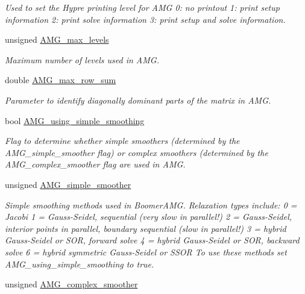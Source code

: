 \begin{DoxyCompactItemize}
\begin{DoxyCompactList}\small\item\em Used to set the Hypre printing level for A\+MG 0\+: no printout 1\+: print setup information 2\+: print solve information 3\+: print setup and solve information. \end{DoxyCompactList}\item 
unsigned \hyperlink{classoomph_1_1HypreInterface_adf57ef35573b468881617d8cae4643c9}{A\+M\+G\+\_\+max\+\_\+levels}
\begin{DoxyCompactList}\small\item\em Maximum number of levels used in A\+MG. \end{DoxyCompactList}\item 
double \hyperlink{classoomph_1_1HypreInterface_af3d118bd7fa11c89ec5fb39dc2f0d218}{A\+M\+G\+\_\+max\+\_\+row\+\_\+sum}
\begin{DoxyCompactList}\small\item\em Parameter to identify diagonally dominant parts of the matrix in A\+MG. \end{DoxyCompactList}\item 
bool \hyperlink{classoomph_1_1HypreInterface_aa4bac4203fb7ec08f5a9fc7cf3f47161}{A\+M\+G\+\_\+using\+\_\+simple\+\_\+smoothing}
\begin{DoxyCompactList}\small\item\em Flag to determine whether simple smoothers (determined by the A\+M\+G\+\_\+simple\+\_\+smoother flag) or complex smoothers (determined by the A\+M\+G\+\_\+complex\+\_\+smoother flag are used in A\+MG. \end{DoxyCompactList}\item 
unsigned \hyperlink{classoomph_1_1HypreInterface_ac2671434b9202b17d9ecff0a7787f83c}{A\+M\+G\+\_\+simple\+\_\+smoother}
\begin{DoxyCompactList}\small\item\em Simple smoothing methods used in Boomer\+A\+MG. Relaxation types include\+: 0 = Jacobi 1 = Gauss-\/\+Seidel, sequential (very slow in parallel!) 2 = Gauss-\/\+Seidel, interior points in parallel, boundary sequential (slow in parallel!) 3 = hybrid Gauss-\/\+Seidel or S\+OR, forward solve 4 = hybrid Gauss-\/\+Seidel or S\+OR, backward solve 6 = hybrid symmetric Gauss-\/\+Seidel or S\+S\+OR To use these methods set A\+M\+G\+\_\+using\+\_\+simple\+\_\+smoothing to true. \end{DoxyCompactList}\item 
unsigned \hyperlink{classoomph_1_1HypreInterface_a7e4d8eeb1fb32cb7ada7c273edbf070e}{A\+M\+G\+\_\+complex\+\_\+smoother}

\end{DoxyCompactItemize}
